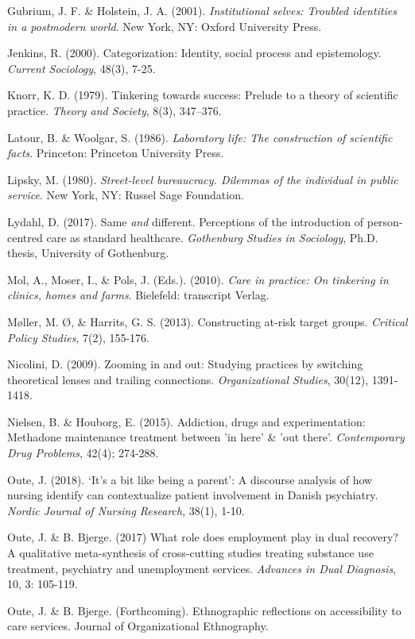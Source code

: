 \begin{thebibliography}{99}
\item Gubrium, J. F. \& Holstein, J. A. (2001). \textit{Institutional selves: Troubled identities in a postmodern world}. New York, NY: Oxford University Press.
\item Jenkins, R. (2000). Categorization: Identity, social process and epistemology. \textit{Current Sociology}, 48(3), 7-25.
\item Knorr, K. D. (1979). Tinkering towards success: Prelude to a theory of scientific practice. \textit{Theory and Society}, 8(3), 347–376.
\item Latour, B. \& Woolgar, S. (1986). \textit{Laboratory life: The construction of scientific facts}. Princeton: Princeton University Press. 
\item Lipsky, M. (1980).\textit{ Street-level bureaucracy. Dilemmas of the individual in public service}. New York, NY: Russel Sage Foundation.
\item Lydahl, D. (2017). Same \textit{and} different. Perceptions of the introduction of person-centred care as standard healthcare. \textit{Gothenburg Studies in Sociology}, Ph.D. thesis, University of Gothenburg.
\item Mol, A., Moser, I., \& Pols, J. (Eds.). (2010). \textit{Care in practice: On tinkering in clinics, homes and farms}. Bielefeld: transcript Verlag.
\item Møller, M. Ø, \& Harrits, G. S. (2013). Constructing at-risk target groups. \textit{Critical Policy Studies}, 7(2), 155-176.
\item Nicolini, D. (2009). Zooming in and out: Studying practices by switching theoretical lenses and
trailing connections. \textit{Organizational Studies}, 30(12), 1391-1418.
\item Nielsen, B. \& Houborg, E. (2015). Addiction, drugs and experimentation: Methadone maintenance treatment between 'in here' \& 'out there'. \textit{Contemporary Drug Problems}, 42(4); 274-288.
\item Oute, J. (2018). ‘It’s a bit like being a parent’: A discourse analysis of how nursing identify can contextualize patient involvement in Danish psychiatry. \textit{Nordic Journal of Nursing Research}, 38(1), 1-10. 
\item Oute, J. \& B. Bjerge. (2017) What role does employment play in dual recovery? A qualitative meta-synthesis of cross-cutting studies treating substance use treatment, psychiatry and unemployment services. \textit{Advances in Dual Diagnosis}, 10, 3: 105-119.
\item Oute, J. \& B. Bjerge. (Forthcoming). Ethnographic reflections on accessibility to care services. Journal of Organizational Ethnography. 

\end{thebibliography}
